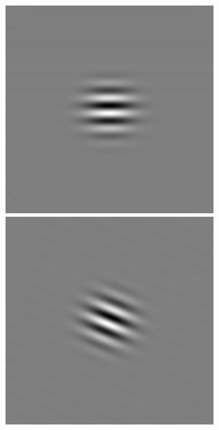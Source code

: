 \begin{figure}[ht]
\begin{center}
 \includegraphics[width=\columnwidth/9]{ch4/figures/iGabor4_4.jpg}
 \includegraphics[width=\columnwidth/9]{ch4/figures/iGabor4_5.jpg}

\end{center}
\end{figure}
